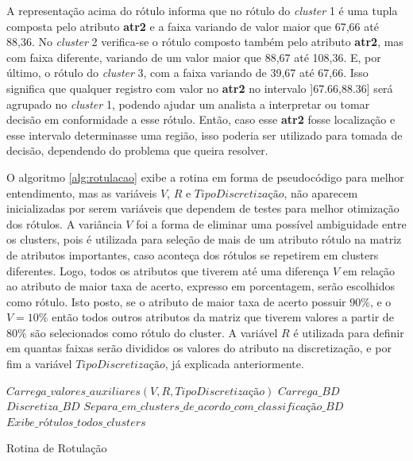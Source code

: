 A representação acima do rótulo informa que no rótulo do \textit{cluster} 1 é uma tupla composta pelo atributo \textbf{atr2} e a faixa variando de valor maior que 67,66 até 88,36. No \textit{cluster} 2 verifica-se o rótulo composto também pelo atributo \textbf{atr2}, mas com faixa diferente, variando de um valor maior que 88,67 até 108,36. E, por último, o rótulo do \textit{cluster} 3, com a faixa variando de 39,67 até 67,66. Isso significa que qualquer registro com valor no \textbf{atr2} no intervalo ]67.66,88.36] será agrupado no \textit{cluster} 1, podendo ajudar um analista a interpretar ou tomar decisão em conformidade a esse rótulo. Então, caso esse \textbf{atr2} fosse localização e esse intervalo determinasse uma região, isso poderia ser utilizado para tomada de decisão, dependendo do problema que queira resolver. 

O algoritmo \ref{alg:rotulacao} exibe a rotina em forma de pseudocódigo para melhor entendimento, mas as variáveis ${V}$, ${R}$ e ${TipoDiscretização}$, não aparecem inicializadas por serem variáveis que dependem de testes para melhor otimização dos rótulos. A variância ${V}$ foi a forma de eliminar uma possível ambiguidade entre os clusters, pois é utilizada para seleção de mais de um atributo rótulo na matriz de atributos importantes, caso aconteça dos rótulos se repetirem em clusters diferentes. Logo, todos os atributos que tiverem até uma diferença ${V}$ em relação ao atributo de maior taxa de acerto, expresso em porcentagem, serão escolhidos como rótulo. Isto posto, se o atributo de maior taxa de acerto possuir ${90\%}$, e o ${V=10\%}$  então todos outros atributos da matriz que tiverem valores a partir de ${80\%}$ são selecionados como rótulo do cluster. A variável ${R}$ é utilizada para definir em quantas faixas serão divididos os valores do atributo na discretização, e por fim a variável ${TipoDiscretização}$, já explicada anteriormente.

\IncMargin{1em}
\begin{algorithm}[h]

\nl $Carrega\_valores\_auxiliares(V,R,TipoDiscretização)$\;
\nl $Carrega\_BD$\; 
\nl $Discretiza\_BD$\; 
\nl $Separa\_em\_clusters\_de\_acordo\_com\_classificação\_BD$\; 
\nl {}
 \nl $Exibe\_rótulos\_todos\_clusters$\; 
 \caption{Rotina de Rotulação}\label{alg:rotulacao}
 
\end{algorithm}
\DecMargin{1em}
        
